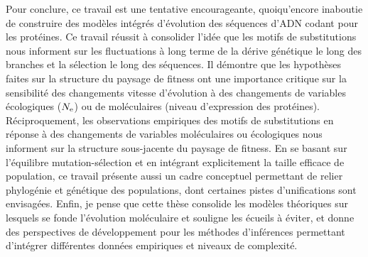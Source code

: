 Pour conclure, ce travail est une tentative encourageante, quoiqu'encore inaboutie de construire des modèles intégrés d'évolution des séquences d'ADN codant pour les protéines.
Ce travail réussit à consolider l'idée que les motifs de substitutions nous informent sur les fluctuations à long terme de la dérive génétique le long des branches et la sélection le long des séquences.
Il démontre que les hypothèses faites sur la structure du paysage de fitness ont une importance critique sur la sensibilité des changements vitesse d'évolution à des changements de variables écologiques ($N_{\textrm{e}}$) ou de moléculaires (niveau d'expression des protéines).
Réciproquement, les observations empiriques des motifs de substitutions en réponse à des changements de variables moléculaires ou écologiques nous informent sur la structure sous-jacente du paysage de fitness.
En se basant sur l'équilibre mutation-sélection et en intégrant explicitement la taille efficace de population, ce travail présente aussi un cadre conceptuel permettant de relier phylogénie et génétique des populations, dont certaines pistes d'unifications sont envisagées.
Enfin, je pense que cette thèse consolide les modèles théoriques sur lesquels se fonde l'évolution moléculaire et souligne les écueils à éviter, et donne des perspectives de développement pour les méthodes d'inférences permettant d'intégrer différentes données empiriques et niveaux de complexité.